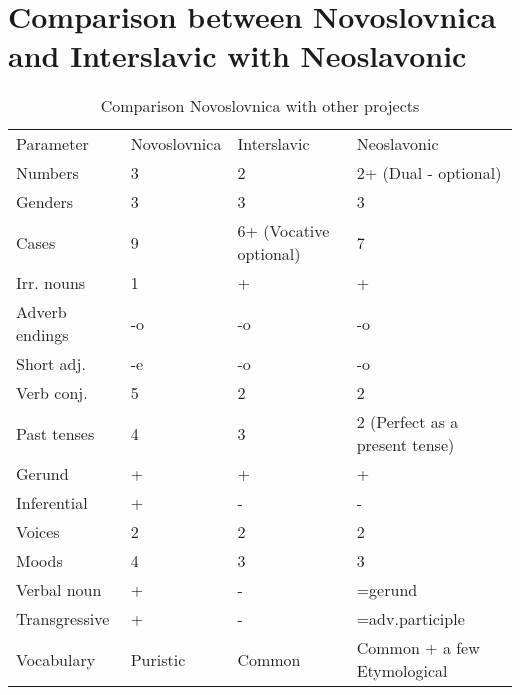 \section{Comparison between Novoslovnica and Interslavic with Neoslavonic}

\begin{table}[!ht]
	\caption{Comparison Novoslovnica with other projects}
	\begin{tabular}{llll}
		Parameter & Novoslovnica & Interslavic & Neoslavonic \\
		Numbers & 3 & 2 & 2+ (Dual - optional) \\
		Genders & 3 & 3 & 3 \\
		Cases & 9 & 6+ (Vocative optional) & 7 \\
		Irr. nouns & 1 & + & + \\
		Adverb endings & -o & -o & -o \\
		Short adj. & -e & -o & -o \\
		Verb conj. & 5 & 2 & 2 \\
		Past tenses & 4 & 3 & 2 (Perfect as a present tense)\\
		Gerund & + & + & + \\
		Inferential & + & - & - \\
		Voices & 2 & 2 & 2 \\
		Moods & 4 & 3 & 3 \\
		Verbal noun & + & - & =gerund \\
		Transgressive & + & - & =adv.participle \\
		Vocabulary & Puristic & Common & Common + a few Etymological 
	\end{tabular}
\end{table}